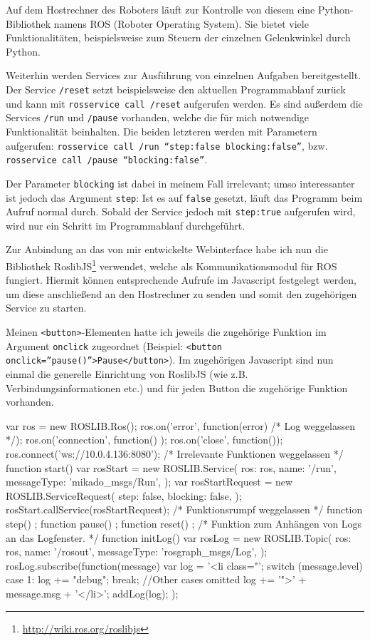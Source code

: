 Auf dem Hostrechner des Roboters läuft zur Kontrolle von diesem eine Python-Bibliothek
namens ROS (Roboter Operating System). Sie bietet viele Funktionalitäten, beispielsweise
zum Steuern der einzelnen Gelenkwinkel durch Python.

Weiterhin werden Services zur Ausführung von einzelnen Aufgaben bereitgestellt.
Der Service \texttt{/reset} setzt beispielsweise den aktuellen Programmablauf
zurück und kann mit \texttt{rosservice call /reset} aufgerufen werden. Es sind
außerdem die Services \texttt{/run} und \texttt{/pause} vorhanden, welche die für
mich notwendige Funktionalität beinhalten. Die beiden letzteren werden mit Parametern
aufgerufen: \texttt{rosservice call /run ``step:false blocking:false''}, bzw.
\texttt{rosservice call /pause ``blocking:false''}.

Der Parameter \texttt{blocking} ist dabei in meinem Fall irrelevant; umso interessanter
ist jedoch das Argument \texttt{step}: Ist es auf \texttt{false} gesetzt, läuft
das Programm beim Aufruf normal durch. Sobald der Service jedoch mit \texttt{step:true}
aufgerufen wird, wird nur ein Schritt im Programmablauf durchgeführt.

Zur Anbindung an das von mir entwickelte Webinterface habe ich nun die Bibliothek
RoslibJS\footnote{\url{http://wiki.ros.org/roslibjs}} verwendet, welche als Kommunikationsmodul für ROS fungiert. Hiermit können
entsprechende Aufrufe im Javascript festgelegt werden, um diese anschließend an
den Hostrechner zu senden und somit den zugehörigen Service zu starten.

Meinen \texttt{<button>}-Elementen hatte ich jeweils die zugehörige Funktion im
Argument \texttt{onclick} zugeordnet (Beispiel: \texttt{<button onclick=''pause()''>Pause</button>}).
Im zugehörigen Javascript sind nun einmal die generelle Einrichtung von RoslibJS
(wie z.B. Verbindungsinformationen etc.) und für jeden Button die zugehörige Funktion
vorhanden.

\begin{code}[language=javascript, caption={Serviceaufruf durch RoslibJS}]
var ros = new ROSLIB.Ros();
ros.on('error', function(error) {/* Log weggelassen */});
ros.on('connection', function() {});
ros.on('close', function(){});
ros.connect('ws://10.0.4.136:8080');
/* Irrelevante Funktionen weggelassen */
function start() {
	var rosStart = new ROSLIB.Service({
		ros: ros, name: '/run', messageType: 'mikado_msgs/Run',
	});
	var rosStartRequest = new ROSLIB.ServiceRequest({
		step: false, blocking: false,
	});
	rosStart.callService(rosStartRequest);
}
/* Funktionsrumpf weggelassen */
function step() {};
function pause() {};
function reset() {};
/* Funktion zum Anhängen von Logs an das Logfenster. */
function initLog() {
	var rosLog = new ROSLIB.Topic({
		ros: ros, name: '/rosout', messageType: 'rosgraph_msgs/Log',
	});
	rosLog.subscribe(function(message) {
		var log = '<li class="';
		switch (message.level) {
			case 1:
				log += "debug";
				break;
		} //Other cases omitted
		log += '">' + message.msg + '</li>';
		addLog(log);
	});
}
\end{code}

